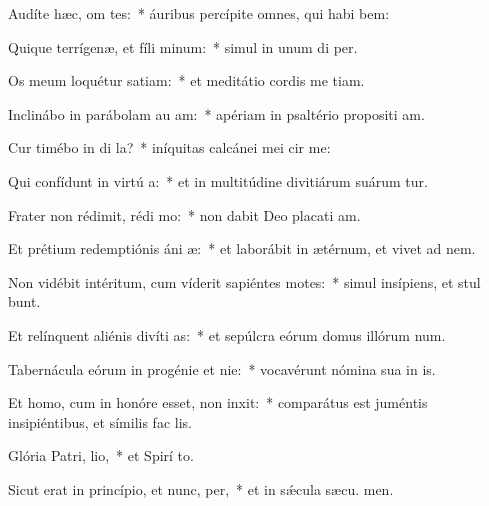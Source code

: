 \item Audíte hæc, om tes:~* áuribus percípite omnes, qui habi bem:
\item Quique terrígenæ, et fíli minum:~* simul in unum di  per.
\item Os meum loquétur satiam:~* et meditátio cordis me tiam.
\item Inclinábo in parábolam au am:~* apériam in psaltério propositi am.
\item Cur timébo in di la?~* iníquitas calcánei mei cir me:
\item Qui confídunt in virtú a:~* et in multitúdine divitiárum suárum tur.
\item Frater non rédimit, rédi mo:~* non dabit Deo placati am.
\item Et prétium redemptiónis áni æ:~* et laborábit in ætérnum, et vivet ad  nem.
\item Non vidébit intéritum, cum víderit sapiéntes motes:~* simul insípiens, et stul bunt.
\item Et relínquent aliénis divíti as:~* et sepúlcra eórum domus illórum  num.
\item Tabernácula eórum in progénie et nie:~* vocavérunt nómina sua in  is.
\item Et homo, cum in honóre esset, non inxit:~* comparátus est juméntis insipiéntibus, et símilis fac  lis.
\item Glória Patri,  lio,~* et Spirí to.
\item Sicut erat in princípio, et nunc,  per,~* et in sǽcula sæcu. men.
